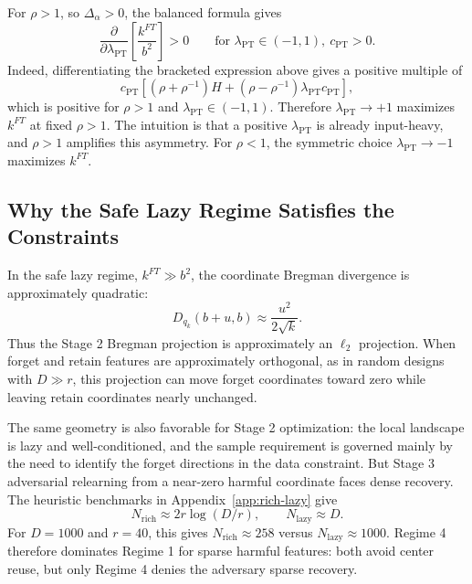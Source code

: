 \documentclass[11pt]{article}
\begin{document}
For \(\rho>1\), so \(\Delta_\alpha>0\), the balanced formula gives
\begin{equation}
    \frac{\partial}{\partial\lambda_{\mathrm{PT}}}
    \left[\frac{k^{FT}}{b^2}\right]
    >0
    \qquad
    \text{for }\lambda_{\mathrm{PT}}\in(-1,1),\ c_{\mathrm{PT}}>0.
\end{equation}
Indeed, differentiating the bracketed expression above gives a positive multiple of
\begin{equation}
    c_{\mathrm{PT}}
    \left[(\rho+\rho^{-1})H+(\rho-\rho^{-1})\lambda_{\mathrm{PT}}c_{\mathrm{PT}}\right],
\end{equation}
which is positive for \(\rho>1\) and \(\lambda_{\mathrm{PT}}\in(-1,1)\). Therefore \(\lambda_{\mathrm{PT}}\to+1\) maximizes \(k^{FT}\) at fixed \(\rho>1\). The intuition is that a positive \(\lambda_{\mathrm{PT}}\) is already input-heavy, and \(\rho>1\) amplifies this asymmetry. For \(\rho<1\), the symmetric choice \(\lambda_{\mathrm{PT}}\to-1\) maximizes \(k^{FT}\).

\subsection{Why the Safe Lazy Regime Satisfies the Constraints}

In the safe lazy regime, \(k^{FT}\gg b^2\), the coordinate Bregman divergence is approximately quadratic:
\begin{equation}
    D_{q_k}(b+u,b)
    \approx
    \frac{u^2}{2\sqrt{k}}.
\end{equation}
Thus the Stage 2 Bregman projection is approximately an \(\ell_2\) projection. When forget and retain features are approximately orthogonal, as in random designs with \(D\gg r\), this projection can move forget coordinates toward zero while leaving retain coordinates nearly unchanged.

The same geometry is also favorable for Stage 2 optimization: the local landscape is lazy and well-conditioned, and the sample requirement is governed mainly by the need to identify the forget directions in the data constraint. But Stage 3 adversarial relearning from a near-zero harmful coordinate faces dense recovery. The heuristic benchmarks in Appendix~\ref{app:rich-lazy} give
\begin{equation}
    N_{\mathrm{rich}}\approx2r\log(D/r),
    \qquad
    N_{\mathrm{lazy}}\approx D.
\end{equation}
For \(D=1000\) and \(r=40\), this gives \(N_{\mathrm{rich}}\approx258\) versus \(N_{\mathrm{lazy}}\approx1000\). Regime 4 therefore dominates Regime 1 for sparse harmful features: both avoid center reuse, but only Regime 4 denies the adversary sparse recovery.
\end{document}
